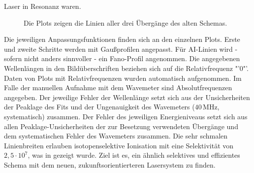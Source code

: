 Laser in Resonanz waren.
\begin{figure}[hp]
 	\centering
 	\footnotesize
	\caption[Anregungsschritte, altes System]{Die
	Plots zeigen die Linien aller drei Übergänge des alten Schemas.}
	\label{fig:linienscans_altes_schema}
\end{figure}
Die jeweiligen Anpassungsfunktionen finden sich an den einzelnen Plots. Erste
und zweite Schritte werden mit Gaußprofilen angepasst. Für
AI-Linien wird - sofern nicht anders sinnvoller - ein Fano-Profil angenommen.
Die angegebenen Wellenlängen in den Bildüberschriften beziehen sich auf die
Relativfrequenz "'$0$"'. Daten von
Plots mit Relativfrequenzen wurden automatisch aufgenommen. Im Falle der
manuellen Aufnahme mit dem Wavemeter sind Absolutfrequenzen angegeben. Der
jeweilige Fehler der Wellenlänge setzt sich aus der Unsicherheiten der
Peaklage des Fits und der Ungenauigkeit des Wavemeters
($40\,$MHz, systematisch) zusammen.
Der Fehler des jeweiligen Energieniveaus setzt sich aus allen
Peaklage-Unsicherheiten der zur Besetzung verwendeten Übergänge und dem
systematischen Fehler des Wavemeters zusammen.
Die sehr schmalen Linienbreiten erlauben isotopenselektive Ionisation mit eine Selektivität von
$2,5\cdot10^7$, was in \cite{raeder:2011:dissertation} gezeigt wurde. Ziel ist
es, ein ähnlich selektives und effizientes Schema mit dem neuen,
zukunftsorientierteren Lasersystem zu finden.

